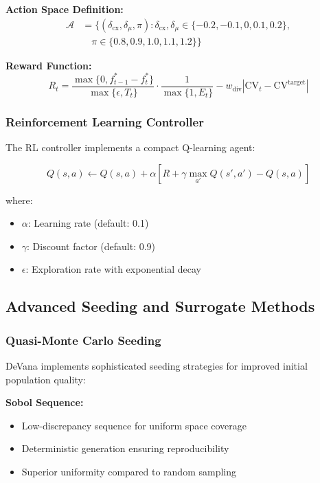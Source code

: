 \documentclass[12pt,a4paper]{article}
\newcommand{\softwareName}{DeVana}
\begin{document}
\textbf{Action Space Definition:}
\begin{align}
\mathcal{A} &= \{(\delta_{\text{cx}}, \delta_{\mu}, \pi) : \delta_{\text{cx}}, \delta_{\mu} \in \{-0.2, -0.1, 0, 0.1, 0.2\}, \\
&\quad \pi \in \{0.8, 0.9, 1.0, 1.1, 1.2\}\}
\end{align}

\textbf{Reward Function:}
\begin{equation}
R_t = \frac{\max\{0, f_{t-1}^* - f_t^*\}}{\max\{\epsilon, T_t\}} \cdot \frac{1}{\max\{1, E_t\}} - w_{\text{div}} |\text{CV}_t - \text{CV}^{\text{target}}|
\end{equation}

\subsubsection{Reinforcement Learning Controller}

The RL controller implements a compact Q-learning agent:

\begin{equation}
Q(s, a) \leftarrow Q(s, a) + \alpha [R + \gamma \max_{a'} Q(s', a') - Q(s, a)]
\end{equation}

where:
\begin{itemize}
    \item $\alpha$: Learning rate (default: 0.1)
    \item $\gamma$: Discount factor (default: 0.9)
    \item $\epsilon$: Exploration rate with exponential decay
\end{itemize}

\subsection{Advanced Seeding and Surrogate Methods}

\subsubsection{Quasi-Monte Carlo Seeding}

\softwareName{} implements sophisticated seeding strategies for improved initial population quality:

\textbf{Sobol Sequence:}
\begin{itemize}
    \item Low-discrepancy sequence for uniform space coverage
    \item Deterministic generation ensuring reproducibility
    \item Superior uniformity compared to random sampling
\end{itemize}
\end{document}
